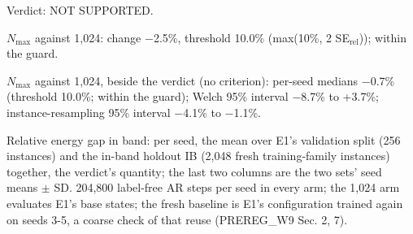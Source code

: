 \begin{table}[t]
\centering
\small
\caption{H1 (2D): does a larger unlabelled pool lower the in-band energy gap at a fixed budget of label-free AR steps?}
\label{tab:w9-h1}

\smallskip
\begin{minipage}{\linewidth}\footnotesize\raggedright
Verdict: NOT SUPPORTED.\par
$N_\mathrm{max}$ against 1,024: change $-$2.5\%, threshold 10.0\% (max(10\%, 2 SE$_\mathrm{rel}$)); within the guard.\par
$N_\mathrm{max}$ against 1,024, beside the verdict (no criterion): per-seed medians $-$0.7\% (threshold 10.0\%; within the guard); Welch 95\% interval $-$8.7\% to +3.7\%; instance-resampling 95\% interval $-$4.1\% to $-$1.1\%.\par
Relative energy gap in band: per seed, the mean over E1's validation split (256 instances) and the in-band holdout IB (2,048 fresh training-family instances) together, the verdict's quantity; the last two columns are the two sets' seed means $\pm$ SD. 204,800 label-free AR steps per seed in every arm; the 1,024 arm evaluates E1's base states; the fresh baseline is E1's configuration trained again on seeds 3-5, a coarse check of that reuse (PREREG\_W9 Sec. 2, 7).
\end{minipage}
\end{table}
